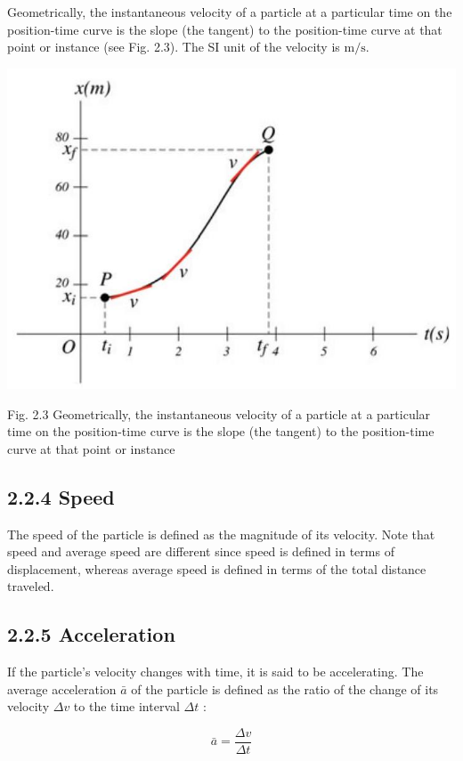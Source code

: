 \documentclass[10pt]{article}
\begin{document}
Geometrically, the instantaneous velocity of a particle at a particular time on the position-time curve is the slope (the tangent) to the position-time curve at that point or instance (see Fig. 2.3). The SI unit of the velocity is $\mathrm{m} / \mathrm{s}$.

\begin{center}
\includegraphics[max width=\textwidth]{2024_09_13_db1f357d2aad0a03eb2eg-028(1)}
\end{center}

Fig. 2.3 Geometrically, the instantaneous velocity of a particle at a particular time on the position-time curve is the slope (the tangent) to the position-time curve at that point or instance

\subsection*{2.2.4 Speed}
The speed of the particle is defined as the magnitude of its velocity. Note that speed and average speed are different since speed is defined in terms of displacement, whereas average speed is defined in terms of the total distance traveled.

\subsection*{2.2.5 Acceleration}
If the particle's velocity changes with time, it is said to be accelerating. The average acceleration $\bar{a}$ of the particle is defined as the ratio of the change of its velocity $\Delta v$ to the time interval $\Delta t$ :

$$
\bar{a}=\frac{\Delta v}{\Delta t}
$$
\end{document}
